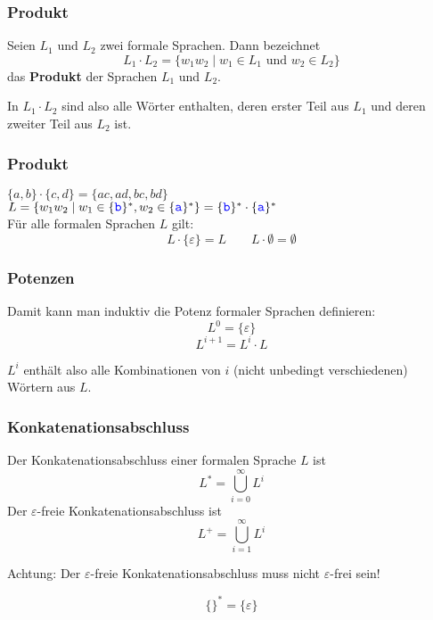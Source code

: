 \begin{frame}
	\frametitle{Produkt}
		\begin{Definition}
			Seien $L_1$ und $L_2$ zwei formale Sprachen. Dann bezeichnet
				$$L_1 \cdot L_2 = \{w_1 w_2 \mid w_1 \in L_1 \text{ und } w_2 \in L_2 \}$$
				das \textbf{Produkt} der Sprachen $L_1$ und $L_2$.
		\end{Definition}
		\pause
		In $L_1 \cdot L_2$ sind also alle Wörter enthalten, deren erster Teil aus $L_1$ und deren zweiter Teil aus $L_2$ ist.
	
\end{frame}

\begin{frame}
	\frametitle{Produkt}
	\begin{Beispiele}
		$\{a, b\} \cdot \{c, d\} = \{ac, ad, bc, bd\}$\\[0.3em]
		\pause
		$ L = \{w_1w_2 \mid w_1\in \{\literal{b}\}^* ,  w_2\in \{\literal{a}\}^* \} 
		= \{\literal{b}\}^* \cdot \{\literal{a}\}^* $\\[1em]
		\pause
		Für alle formalen Sprachen $L$ gilt:\\
		$$ L \cdot \{\varepsilon\} = L  \qquad L \cdot \emptyset = \emptyset$$
	\end{Beispiele}
\end{frame}

\begin{frame}
	\frametitle{Potenzen}
	\begin{Definition}
	Damit kann man induktiv die Potenz formaler Sprachen definieren:
	$$L^0 = \{\varepsilon \}$$
	$$L^{i+1} = L^i \cdot L$$
	\end{Definition} \pause
	$L^i$ enthält also alle Kombinationen von $i$ (nicht unbedingt verschiedenen) Wörtern aus $L$.
\end{frame}

\begin{frame}
	\frametitle{Konkatenationsabschluss}
	\begin{Definition}
		Der Konkatenationsabschluss einer formalen Sprache $L$ ist $$L^\ast = \bigcup \limits_{i=0}^\infty L^i$$ 
		\pause
		Der $\varepsilon$-freie Konkatenationsabschluss ist $$L^+ = \bigcup \limits_{i=1}^\infty L^i$$
	\end{Definition} \pause
	Achtung: Der $\varepsilon$-freie Konkatenationsabschluss muss nicht $\varepsilon$-frei sein! \pause
	
	$$ \{\}^* = \{\varepsilon\} $$
\end{frame}


